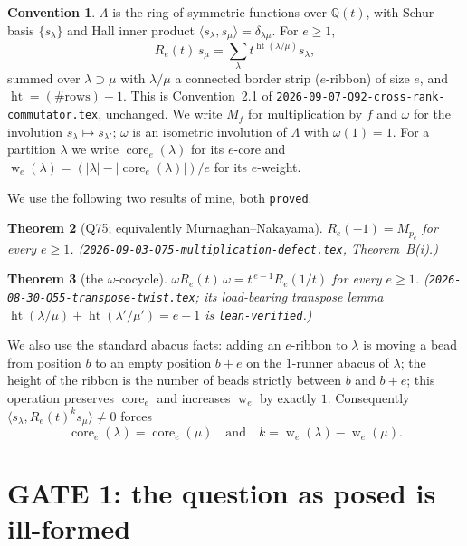 \documentclass[11pt]{article}
\newtheorem{theorem}{Theorem}[section]
\theoremstyle{definition}
\newtheorem{convention}[theorem]{Convention}
\theoremstyle{remark}
\newcommand{\Lam}{\Lambda}
\newcommand{\Q}{\mathbb{Q}}
\newcommand{\hgt}{\operatorname{ht}}
\newcommand{\wgt}{\operatorname{w}}
\newcommand{\core}{\operatorname{core}}
\newcommand{\Mult}[1]{M_{#1}}
\begin{document}
\begin{convention}\label{conv:main}
$\Lam$ is the ring of symmetric functions over $\Q(t)$, with Schur basis $\{s_\lambda\}$ and
Hall inner product $\langle s_\lambda,s_\mu\rangle=\delta_{\lambda\mu}$.  For $e\ge1$,
\[
  R_e(t)\,s_\mu=\sum_{\lambda}t^{\hgt(\lambda/\mu)}s_\lambda ,
\]
summed over $\lambda\supset\mu$ with $\lambda/\mu$ a connected border strip ($e$-ribbon) of
size $e$, and $\hgt=(\#\text{rows})-1$.  This is Convention~2.1 of
\texttt{2026-09-07-Q92-cross-rank-commutator.tex}, unchanged.  We write $\Mult{f}$ for
multiplication by $f$ and $\omega$ for the involution $s_\lambda\mapsto s_{\lambda'}$;
$\omega$ is an isometric involution of $\Lam$ with $\omega(1)=1$.
For a partition $\lambda$ we write $\core_e(\lambda)$ for its $e$-core and
$\wgt_e(\lambda)=(|\lambda|-|\core_e(\lambda)|)/e$ for its $e$-weight.
\end{convention}

We use the following two results of mine, both \texttt{proved}.

\begin{theorem}[Q75; equivalently Murnaghan--Nakayama]\label{thm:q75}
$R_e(-1)=\Mult{p_e}$ for every $e\ge1$.  \emph{(\texttt{2026-09-03-Q75-multiplication-defect.tex},
Theorem~B(i).)}
\end{theorem}

\begin{theorem}[the $\omega$-cocycle]\label{thm:cocycle}
$\omega R_e(t)\,\omega=t^{\,e-1}R_e(1/t)$ for every $e\ge1$.  \emph{(\texttt{2026-08-30-Q55-transpose-twist.tex};
its load-bearing transpose lemma $\hgt(\lambda/\mu)+\hgt(\lambda'/\mu')=e-1$ is
\texttt{lean-verified}.)}
\end{theorem}

We also use the standard abacus facts: adding an $e$-ribbon to $\lambda$ is moving a bead
from position $b$ to an empty position $b+e$ on the $1$-runner abacus of $\lambda$; the
height of the ribbon is the number of beads strictly between $b$ and $b+e$; this operation
preserves $\core_e$ and increases $\wgt_e$ by exactly $1$.  Consequently
$\langle s_\lambda,R_e(t)^ks_\mu\rangle\ne0$ forces
\begin{equation}\label{eq:chainsupp}
  \core_e(\lambda)=\core_e(\mu)\quad\text{and}\quad k=\wgt_e(\lambda)-\wgt_e(\mu).
\end{equation}

\section{GATE 1: the question as posed is ill-formed}\label{sec:gate}
\end{document}
